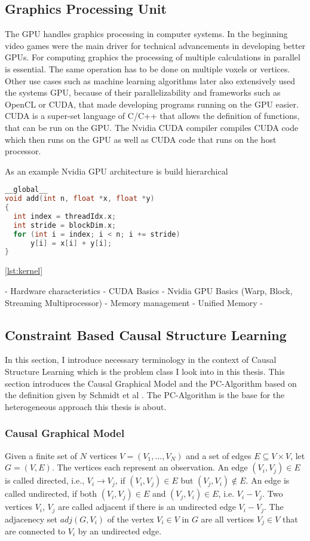 \subsection{Graphics Processing Unit}
The GPU handles graphics processing in computer systems. In the beginning video games were the main driver for technical advancements in developing better GPUs. For computing graphics the processing of multiple calculations in parallel is essential. The same operation has to be done on multiple voxels or vertices. Other use cases such as machine learning algorithms later also extensively used the systems GPU, because of their parallelizability and frameworks such as OpenCL or CUDA, that made developing programs running on the GPU easier.
CUDA is a super-set language of C/C++ that allows the definition of functions, that can be run on the GPU. The Nvidia CUDA compiler compiles CUDA code which then runs on the GPU as well as CUDA code that runs on the host processor.

As an example Nvidia GPU architecture is build hierarchical 
\begin{lstlisting}[language=C++, caption=Cuda kernel example, label=lst:kernel]
__global__
void add(int n, float *x, float *y)
{
  int index = threadIdx.x;
  int stride = blockDim.x;
  for (int i = index; i < n; i += stride)
      y[i] = x[i] + y[i];
}
\end{lstlisting}

\ref{lst:kernel}

- Hardware characteristics
- CUDA Basics
- Nvidia GPU Basics (Warp, Block, Streaming Multiprocessor)
- Memory management
- Unified Memory
- 

\subsection{Constraint Based Causal Structure Learning}
In this section, I introduce necessary terminology in the context of Causal Structure Learning which is the problem class I look into in this thesis. This section introduces the Causal Graphical Model and the PC-Algorithm based on the definition given by Schmidt et al \cite{schmidt_order-independent_2018}. The PC-Algorithm is the base for the heterogeneous approach this thesis is about.

\subsubsection{Causal Graphical Model}
Given a finite set of $N$ vertices $V = (V_1,...,V_N)$ and a set of edges $E \subseteq V \times V$, let $G = (V,E)$. The vertices each represent an observation. An edge $(V_i, V_j) \in E$ is called directed, i.e., $V_i \rightarrow V_j$, if $(V_i,V_j) \in E$ but $(V_j, V_i) \notin E$. An edge is called undirected, if both $(V_i,V_j) \in E$ and $(V_j, V_i) \in E$, i.e. $V_i - V_j$. Two vertices $V_i$, $V_j$ are called adjacent if there is an undirected edge $V_i - V_j$. The adjacenecy set $adj(G, V_i)$ of the vertex $V_i \in V$ in $G$ are all vertices $V_j \in V$ that are connected to $V_i$ by an undirected edge.

